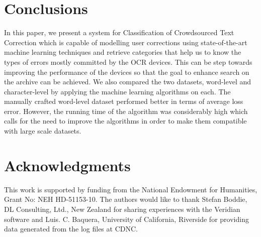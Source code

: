 \documentclass{acm_proc_article-sp}
\begin{document}
\section{Conclusions}
In this paper, we present a system for Classification of Crowdsourced Text Correction which is capable of modelling user corrections using state-of-the-art machine learning techniques and retrieve categories that help us to know the types of errors mostly committed by the OCR devices. This can be step towards improving the performance of the devices so that the goal to enhance search on the archive can be achieved. We also compared the two datasets, word-level and character-level by applying the machine learning algorithms on each. The manually crafted word-level dataset performed better in terms of average loss error. However, the running time of the algorithm was considerably high which calls for the need to improve the algorithms in order to make them compatible with large scale datasets.\\

\section{Acknowledgments}
This work is supported by funding from the National Endowment for Humanities, Grant No: NEH HD-51153-10.  The authors would like to thank Stefan Boddie, DL Consulting, Ltd., New Zealand for sharing experiences with the Veridian software and Luis. C. Baquera, University of California, Riverside for providing data generated from the log files at CDNC.\\

%
%
%


\balancecolumns
\end{document}
